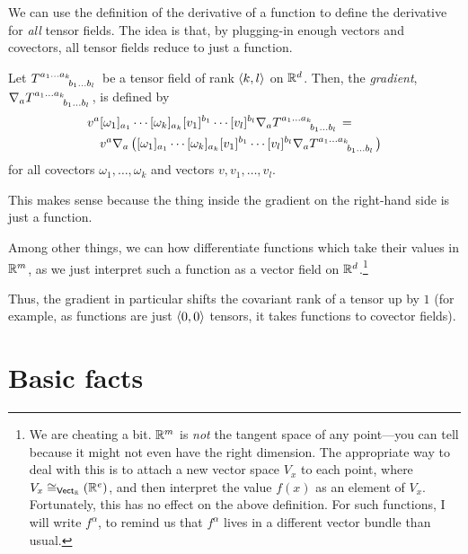 We can use the definition of the derivative of a function to define the derivative for \emph{all} tensor fields.  The idea is that, by plugging-in enough vectors and covectors, all tensor fields reduce to just a function.
\begin{dfn}\label{DerivativeTensor}
Let $T\indices{^{a_1\ldots a_k}_{b_1\ldots b_l}}$ be a tensor field of rank $\langle k,l\rangle$ on $\mathbb{R} ^d$.  Then, the \emph{gradient}, $\nabla _aT\indices{^{a_1\ldots a_k}_{b_1\ldots b_l}}$, is defined by
\begin{equation}
\begin{multlined}
v^a[\omega _1]_{a_1}\cdots [\omega _k]_{a_k}[v_1]^{b_1}\cdots [v_l]^{b_l}\nabla _aT\indices{^{a_1\ldots a_k}_{b_1\ldots b_l}}= \\ v^a\nabla _a\left( [\omega _1]_{a_1}\cdots [\omega _k]_{a_k}[v_1]^{b_1}\cdots [v_l]^{b_l}\nabla _aT\indices{^{a_1\ldots a_k}_{b_1\ldots b_l}}\right) 
\end{multlined}
\end{equation}
for all covectors $\omega _1,\ldots ,\omega _k$ and vectors $v,v_1,\ldots ,v_l$.
\begin{rmk}
This makes sense because the thing inside the gradient on the right-hand side is just a function.
\end{rmk}
\begin{rmk}
Among other things, we can how differentiate functions which take their values in $\mathbb{R} ^m$, as we just interpret such a function as a vector field on $\mathbb{R} ^d$.\footnote{We are cheating a bit.  $\mathbb{R} ^m$ is \emph{not} the tangent space of any point---you can tell because it might not even have the right dimension.  The appropriate way to deal with this is to attach a new vector space $V_x$ to each point, where $V_x\cong _{\mathsf{Vect} _{\mathbb{R}}}(\mathbb{R} ^e)$, and then interpret the value $f(x)$ as an element of $V_x$.  Fortunately, this has no effect on the above definition.  For such functions, I will write $f^\alpha$, to remind us that $f^\alpha$ lives in a different vector bundle than usual.}
\end{rmk}
\begin{rmk}
Thus, the gradient in particular shifts the covariant rank of a tensor up by $1$ (for example, as functions are just $\langle0,0\rangle$ tensors, it takes functions to covector fields).
\end{rmk}
\end{dfn}

\section{Basic facts}

